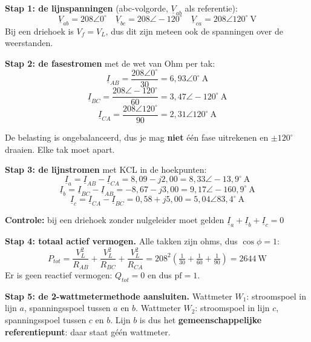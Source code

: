 \documentclass[a4paper,11pt]{article}
\begin{document}
\begin{oefenblok}

    \textbf{Stap 1: de lijnspanningen} (abc-volgorde, $\underline{V}_{ab}$ als referentie):
    \[\underline{V}_{ab} = 208\angle 0^\circ \quad
        \underline{V}_{bc} = 208\angle -120^\circ \quad
        \underline{V}_{ca} = 208\angle 120^\circ\ \text{V}\]
    Bij een driehoek is $V_f = V_L$, dus dit zijn meteen ook de spanningen over de weerstanden.

    \textbf{Stap 2: de fasestromen} met de wet van Ohm per tak:
    \[\underline{I}_{AB} = \frac{208\angle 0^\circ}{30} = 6{,}93\angle 0^\circ\ \text{A}\]
    \[\underline{I}_{BC} = \frac{208\angle -120^\circ}{60} = 3{,}47\angle -120^\circ\ \text{A}\]
    \[\underline{I}_{CA} = \frac{208\angle 120^\circ}{90} = 2{,}31\angle 120^\circ\ \text{A}\]

    \begin{waarschuwing}[Ongebalanceerd]
        De belasting is ongebalanceerd, dus je mag \textbf{niet} één fase uitrekenen en
        $\pm 120^\circ$ draaien. Elke tak moet apart.
    \end{waarschuwing}

    \textbf{Stap 3: de lijnstromen} met KCL in de hoekpunten:
    \[\underline{I}_a = \underline{I}_{AB} - \underline{I}_{CA} = 8{,}09 - j2{,}00 = \boxed{8{,}33\angle -13{,}9^\circ\ \text{A}}\]
    \[\underline{I}_b = \underline{I}_{BC} - \underline{I}_{AB} = -8{,}67 - j3{,}00 = \boxed{9{,}17\angle -160{,}9^\circ\ \text{A}}\]
    \[\underline{I}_c = \underline{I}_{CA} - \underline{I}_{BC} = 0{,}58 + j5{,}00 = \boxed{5{,}04\angle 83{,}4^\circ\ \text{A}}\]

    \textbf{Controle:} bij een driehoek zonder nulgeleider moet gelden
    $\underline{I}_a + \underline{I}_b + \underline{I}_c = 0$ \checkmark

    \textbf{Stap 4: totaal actief vermogen.} Alle takken zijn ohms, dus $\cos\phi = 1$:
    \[P_{tot} = \frac{V_L^2}{R_{AB}} + \frac{V_L^2}{R_{BC}} + \frac{V_L^2}{R_{CA}}
        = 208^2\left(\tfrac{1}{30} + \tfrac{1}{60} + \tfrac{1}{90}\right) = \boxed{2644\ \text{W}}\]
    Er is geen reactief vermogen: $Q_{tot} = 0$ en dus $\text{pf} = 1$.

    \textbf{Stap 5: de 2-wattmetermethode aansluiten.}
    Wattmeter $W_1$: stroomspoel in lijn $a$, spanningsspoel tussen $a$ en $b$.
    Wattmeter $W_2$: stroomspoel in lijn $c$, spanningsspoel tussen $c$ en $b$.
    Lijn $b$ is dus het \textbf{gemeenschappelijke referentiepunt}: daar staat géén wattmeter.


\end{oefenblok}
\end{document}
